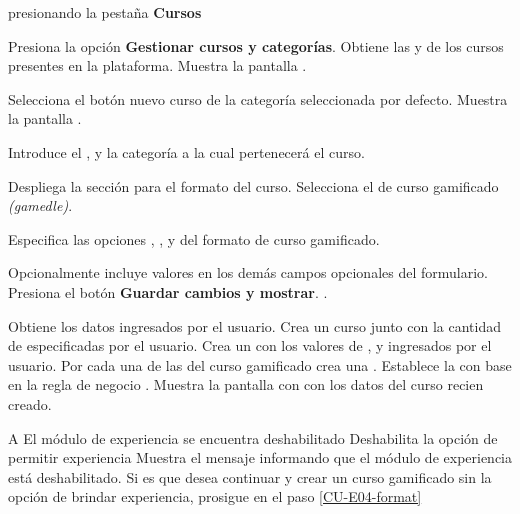 \begin{UCtrayectoria}%
   presionando la pestaña {\bf Cursos}

  \Actor Presiona la opción {\bf Gestionar cursos y categorías}.
  \Sistema Obtiene las  y 
            de los cursos presentes en la plataforma.
  \Sistema Muestra la pantalla .

  \Actor Selecciona el botón nuevo curso de la categoría seleccionada por defecto.
  \Sistema Muestra la pantalla .

  \Actor Introduce el ,  y
         la categoría a la cual pertenecerá el curso.

  \Actor Despliega la sección para el formato del curso. 
  \Actor Selecciona el  de curso gamificado {\it(gamedle)}.
          \label{CU-E04-format}

  \Actor Especifica las opciones ,
         ,  y
          del formato de curso gamificado.
          

  \Actor Opcionalmente incluye valores en los demás campos opcionales del formulario.
  \Actor Presiona el botón {\bf Guardar cambios y mostrar}.  
          \label{CU-E04-submit}.

  \Sistema Obtiene los datos ingresados por el usuario.
  \Sistema Crea un curso  junto con la cantidad de
            especificadas por el usuario.
  \Sistema Crea un  con los valores de ,
            y  ingresados por el
           usuario.
  \Sistema Por cada una de las  del curso gamificado
           crea una .
  \Sistema Establece la  con base en la regla de negocio
           .
  \Sistema Muestra la pantalla con  con los datos del curso recien creado.

\end{UCtrayectoria}

\begin{UCtrayectoriaA}{A}{%
El módulo de experiencia se encuentra deshabilitado
}
  \Sistema Deshabilita la opción de permitir experiencia
  \Sistema Muestra el mensaje informando que el módulo de experiencia está 
           deshabilitado.
  \Actor Si es que desea continuar y crear un curso gamificado sin la opción
         de brindar experiencia, prosigue en el paso \ref{CU-E04-format}

\end{UCtrayectoriaA}

